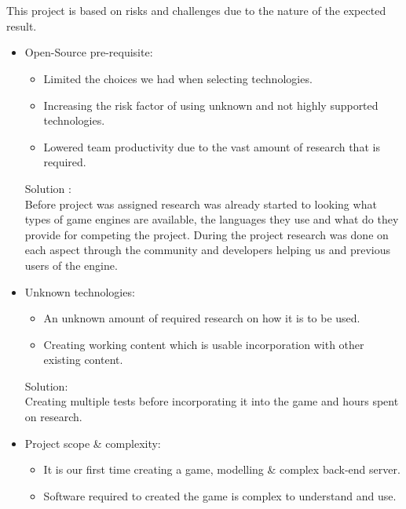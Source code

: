 \documentclass[letterpaper]{article}
\begin{document}
		\vspace{0.2in}
	\section*{\colorbox{black}{}} 
		\vspace{0.1in}
		
		This project is based on risks and challenges due to the nature of the expected result.
		
		\begin{itemize}
			\item Open-Source pre-requisite:
				\begin{itemize}
					\item Limited the choices we had when selecting technologies.
					\item Increasing the risk factor of using unknown and not highly supported technologies.
					\item Lowered team productivity due to the vast amount of research that is required.
				\end{itemize}
				Solution : \\
				Before project was assigned research was already started to looking what types of game engines are available, the languages they use and what do they provide for competing the project. During the project research was done on each aspect through the community and developers helping us and previous users of the engine.
			\item Unknown technologies:
				\begin{itemize}
					\item An unknown amount of required research on how it is to be used.
					\item Creating working content which is usable incorporation with other existing content.
				\end{itemize}
				Solution: \\
				Creating multiple tests before incorporating it into the game and hours spent on research.
			\item Project scope \& complexity:
				\begin{itemize}
					\item It is our first time creating a game, modelling \& complex back-end server.
					\item Software required to created the game is complex to understand and use.

\end{itemize}
\end{itemize}
\end{document}
